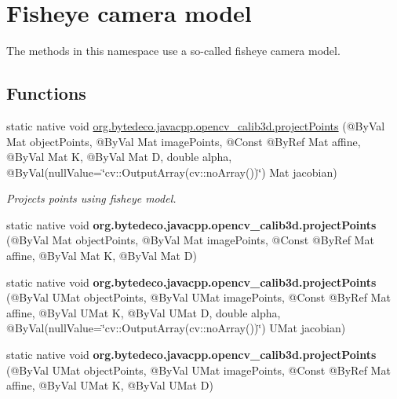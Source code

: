 \hypertarget{group__calib3d__fisheye}{}\section{Fisheye camera model}
\label{group__calib3d__fisheye}


The methods in this namespace use a so-\/called fisheye camera model.  


\subsection*{Functions}
\begin{DoxyCompactItemize}
\item 
static native void \hyperlink{group__calib3d__fisheye_gaf2fa76c626de207fce922dd3c2a1defc}{org.\+bytedeco.\+javacpp.\+opencv\+\_\+calib3d.\+project\+Points} (@By\+Val Mat object\+Points, @By\+Val Mat image\+Points, @Const @By\+Ref Mat affine, @By\+Val Mat K, @By\+Val Mat D, double alpha, @By\+Val(null\+Value=\char`\"{}cv\+::\+Output\+Array(cv\+::no\+Array())\char`\"{}) Mat jacobian)
\begin{DoxyCompactList}\small\item\em Projects points using fisheye model. \end{DoxyCompactList}\item 
\mbox{\label{group__calib3d__fisheye_ga23a1520c1b703c9b3f1e381781429455}} 
static native void {\bfseries org.\+bytedeco.\+javacpp.\+opencv\+\_\+calib3d.\+project\+Points} (@By\+Val Mat object\+Points, @By\+Val Mat image\+Points, @Const @By\+Ref Mat affine, @By\+Val Mat K, @By\+Val Mat D)
\item 
\mbox{\label{group__calib3d__fisheye_ga7fc6fb8c74bd9d74cf1f85c0ed19c814}} 
static native void {\bfseries org.\+bytedeco.\+javacpp.\+opencv\+\_\+calib3d.\+project\+Points} (@By\+Val U\+Mat object\+Points, @By\+Val U\+Mat image\+Points, @Const @By\+Ref Mat affine, @By\+Val U\+Mat K, @By\+Val U\+Mat D, double alpha, @By\+Val(null\+Value=\char`\"{}cv\+::\+Output\+Array(cv\+::no\+Array())\char`\"{}) U\+Mat jacobian)
\item 
\mbox{\label{group__calib3d__fisheye_ga7829e2860577899584d09dd0bbd5f0cb}} 
static native void {\bfseries org.\+bytedeco.\+javacpp.\+opencv\+\_\+calib3d.\+project\+Points} (@By\+Val U\+Mat object\+Points, @By\+Val U\+Mat image\+Points, @Const @By\+Ref Mat affine, @By\+Val U\+Mat K, @By\+Val U\+Mat D)

\end{DoxyCompactItemize}
